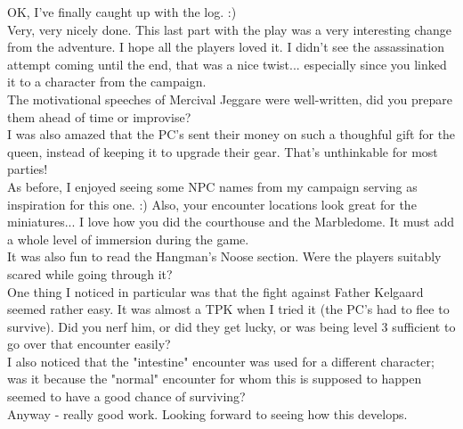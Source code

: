 OK, I've finally caught up with the log. :)\\

Very, very nicely done. This last part with the play was a very interesting change from the adventure. I hope all the players loved it. I didn't see the assassination attempt coming until the end, that was a nice twist... especially since you linked it to a character from the campaign.\\

The motivational speeches of Mercival Jeggare were well-written, did you prepare them ahead of time or improvise?\\

I was also amazed that the PC's sent their money on such a thoughful gift for the queen, instead of keeping it to upgrade their gear. That's unthinkable for most parties!\\

As before, I enjoyed seeing some NPC names from my campaign serving as inspiration for this one. :) Also, your encounter locations look great for the miniatures... I love how you did the courthouse and the Marbledome. It must add a whole level of immersion during the game.\\

It was also fun to read the Hangman's Noose section. Were the players suitably scared while going through it?\\

One thing I noticed in particular was that the fight against Father Kelgaard seemed rather easy. It was almost a TPK when I tried it (the PC's had to flee to survive). Did you nerf him, or did they get lucky, or was being level 3 sufficient to go over that encounter easily?\\

I also noticed that the "intestine" encounter was used for a different character; was it because the "normal" encounter for whom this is supposed to happen seemed to have a good chance of surviving?\\

Anyway - really good work. Looking forward to seeing how this develops.\\

